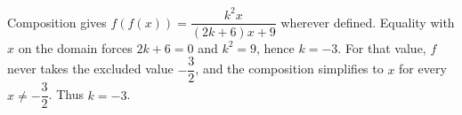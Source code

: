Composition gives $f(f(x))=\dfrac{k^2x}{(2k+6)x+9}$ wherever defined. Equality with $x$ on the domain forces $2k+6=0$ and $k^2=9$, hence $k=-3$. For that value, $f$ never takes the excluded value $-\dfrac{3}{2}$, and the composition simplifies to $x$ for every $x\ne-\dfrac{3}{2}$. Thus $\boxed{k=-3}$.
